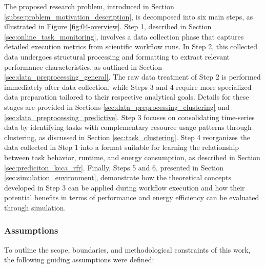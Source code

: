 The proposed research problem, introduced in Section \ref{subse:problem_motivation_description}, is decomposed into six main steps, as illustrated in Figure \ref{fig:04-overview}. Step 1, described in Section \ref{sec:online_task_monitoring}, involves a data collection phase that captures detailed execution metrics from scientific workflow runs. In Step 2, this collected data undergoes structural processing and formatting to extract relevant performance characteristics, as outlined in Section \ref{sec:data_preprocessing_general}. The raw data treatment of Step 2 is performed immediately after data collection, while Steps 3 and 4 require more specialized data preparation tailored to their respective analytical goals. Details for these stages are provided in Sections \ref{sec:data_preprocessing_clustering} and \ref{sec:data_preprocessing_predictive}.
Step 3 focuses on consolidating time-series data by identifying tasks with complementary resource usage patterns through clustering, as discussed in Section \ref{sec:task_clustering}. Step 4 reorganizes the data collected in Step 1 into a format suitable for learning the relationship between task behavior, runtime, and energy consumption, as described in Section \ref{sec:prediciton_kcca_rfr}. Finally, Steps 5 and 6, presented in Section \ref{sec:simulation_environment}, demonstrate how the theoretical concepts developed in Step 3 can be applied during workflow execution and how their potential benefits in terms of performance and energy efficiency can be evaluated through simulation.

\subsubsection{Assumptions}
\label{sec:assumptions}

To outline the scope, boundaries, and methodological constraints of this work, the following guiding assumptions were defined:

